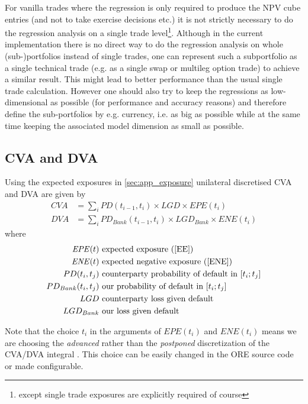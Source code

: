\documentclass[12pt, a4paper]{article}
\newcommand{\CVA}{\mathit{CVA}}
\newcommand{\DVA}{\mathit{DVA}}
\newcommand{\EPE}{\mathit{EPE}}
\newcommand{\ENE}{\mathit{ENE}}
\newcommand{\PD}{\mathit{PD}}
\newcommand{\LGD}{\mathit{LGD}}
\begin{document}
{\begin{appendix}
For vanilla trades where the regression is only required to produce the NPV cube entries (and not to take exercise
decisions etc.) it is not strictly necessary to do the regression analysis on a single trade level\footnote{except
  single trade exposures are explicitly required of course}. Although in the current implementation there is no direct
way to do the regression analysis on whole (sub-)portfolios instead of single trades, one can represent such a
subportfolio as a single technical trade (e.g. as a single swap or multileg option trade) to achieve a similar
result. This might lead to better performance than the usual single trade calculation. However one should also try to
keep the regressions as low-dimensional as possible (for performance and accuracy reasons) and therefore define the
sub-portfolios by e.g. currency, i.e. as big as possible while at the same time keeping the associated model dimension as
small as possible.

\subsection{CVA and DVA}\label{sec:app_cvadva}

Using the expected exposures in \ref{sec:app_exposure} unilateral discretised CVA and DVA are given by \cite{Lichters}
\begin{align}
\CVA &= \sum_{i} \PD(t_{i-1},t_i)\times\LGD\times \EPE(t_i) \label{CVA}\\
\DVA &= \sum_{i} \PD_{Bank}(t_{i-1},t_i)\times\LGD_{Bank}\times \ENE(t_i) \label{DVA}
\end{align}
where
\begin{align*}
\EPE(t) & \mbox{ expected exposure (\ref{EE})}\\
\ENE(t) & \mbox{ expected negative exposure (\ref{ENE})}\\
PD(t_i,t_j) & \mbox{ counterparty probability of default in } [t_i;t_j]\\
PD_{Bank}(t_i,t_j) & \mbox{ our probability of default in } [t_i;t_j]\\
LGD & \mbox{ counterparty loss given default}\\
LGD_{Bank} & \mbox{ our loss given default}\\
\end{align*}

Note that the choice $t_i$ in the arguments of $\EPE(t_i)$ and $\ENE(t_i)$ means we are choosing the {\em advanced}
rather than the {\em postponed} discretization of the CVA/DVA integral \cite{BrigoMercurio}. This choice can be easily
changed in the ORE source code or made configurable. \\


\end{appendix}}
\end{document}
